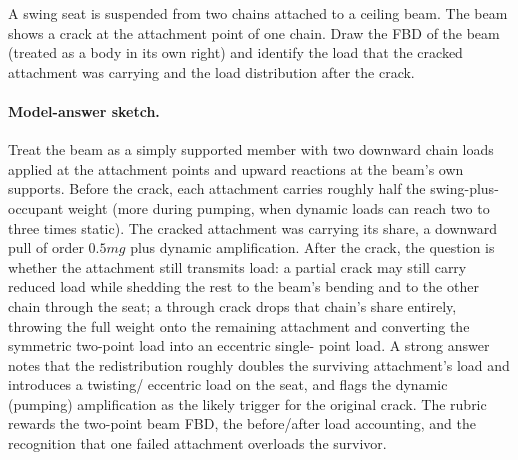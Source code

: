 \begin{exercise}
A swing seat is suspended from two chains attached to a ceiling beam.
The beam shows a crack at the attachment point of one chain. Draw the
FBD of the beam (treated as a body in its own right) and identify
the load that the cracked attachment was carrying and the load
distribution after the crack.
\paragraph{Model-answer sketch.} Treat the beam as a simply supported
member with two downward chain loads applied at the attachment points
and upward reactions at the beam's own supports. Before the crack, each
attachment carries roughly half the swing-plus-occupant weight (more
during pumping, when dynamic loads can reach two to three times static).
The cracked attachment was carrying its share, a downward pull of order
$0.5 mg$ plus dynamic amplification. After the crack, the question is
whether the attachment still transmits load: a partial crack may still
carry reduced load while shedding the rest to the beam's bending and to
the other chain through the seat; a through crack drops that chain's
share entirely, throwing the full weight onto the remaining attachment
and converting the symmetric two-point load into an eccentric single-
point load. A strong answer notes that the redistribution roughly
doubles the surviving attachment's load and introduces a twisting/
eccentric load on the seat, and flags the dynamic (pumping) amplification
as the likely trigger for the original crack. The rubric rewards the
two-point beam FBD, the before/after load accounting, and the
recognition that one failed attachment overloads the survivor.
\end{exercise}

